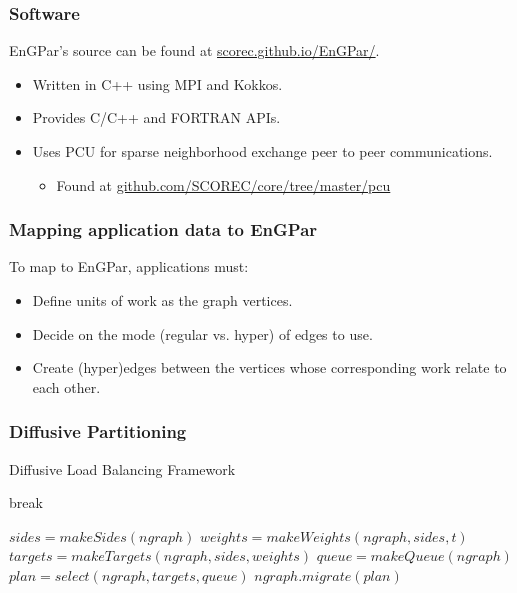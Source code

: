 \documentclass{beamer}
\begin{document}
\begin{frame}
  \frametitle{Software}
  EnGPar's source can be found at \url{scorec.github.io/EnGPar/}.
  \begin{itemize}
  \item Written in C++ using MPI and Kokkos.
  \item Provides C/C++ and FORTRAN APIs.
  \item Uses PCU for sparse neighborhood exchange peer to peer communications.
    \begin{itemize}
      \item Found at \url{github.com/SCOREC/core/tree/master/pcu}
      \end{itemize}
  \end{itemize}
\end{frame}

\begin{frame}
  \frametitle{Mapping application data to EnGPar}
  To map to EnGPar, applications must:
  \begin{itemize}
  \item Define units of work as the graph vertices.
  \item Decide on the mode (regular vs. hyper) of edges to use.
  \item Create (hyper)edges between the vertices whose corresponding work relate to each other.
  \end{itemize}
\end{frame}


\begin{frame}
  \frametitle{Diffusive Partitioning}
  \begin{algorithm}[H]
    \caption{Diffusive Load Balancing Framework}
    \label{alg:engpar}
    \small
    \begin{algorithmic}[1]
      \State break
      \EndIf
      \EndWhile
      \EndFor
      \EndProcedure

      \State $sides = makeSides(ngraph)$
      \State $weights = makeWeights(ngraph,sides,t)$
      \State $targets = makeTargets(ngraph,sides,weights)$
      \State $queue = makeQueue(ngraph)$
      \State $plan = select(ngraph,targets,queue)$
      \State $ngraph.migrate(plan)$
      \EndProcedure
    \end{algorithmic}
  \end{algorithm}
\end{frame}
\end{document}
